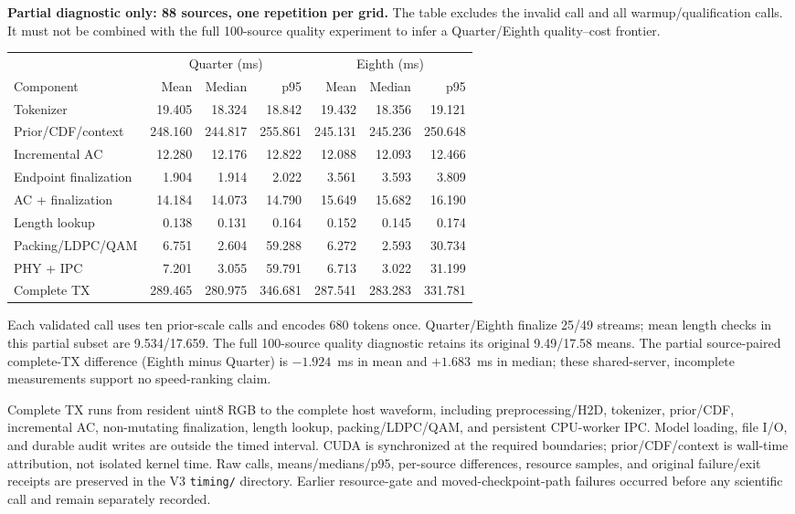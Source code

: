 \textbf{Partial diagnostic only: 88 sources, one repetition per grid.} The table excludes the invalid call and all warmup/qualification calls. It must not be combined with the full 100-source quality experiment to infer a Quarter/Eighth quality--cost frontier.
\begin{center}\small\setlength{\tabcolsep}{4pt}\begin{tabular}{lrrrrrr}\toprule
 & \multicolumn{3}{c}{Quarter (ms)} & \multicolumn{3}{c}{Eighth (ms)}\\
Component & Mean & Median & p95 & Mean & Median & p95\\\midrule
Tokenizer & 19.405 & 18.324 & 18.842 & 19.432 & 18.356 & 19.121\\
Prior/CDF/context & 248.160 & 244.817 & 255.861 & 245.131 & 245.236 & 250.648\\
Incremental AC & 12.280 & 12.176 & 12.822 & 12.088 & 12.093 & 12.466\\
Endpoint finalization & 1.904 & 1.914 & 2.022 & 3.561 & 3.593 & 3.809\\
AC + finalization & 14.184 & 14.073 & 14.790 & 15.649 & 15.682 & 16.190\\
Length lookup & 0.138 & 0.131 & 0.164 & 0.152 & 0.145 & 0.174\\
Packing/LDPC/QAM & 6.751 & 2.604 & 59.288 & 6.272 & 2.593 & 30.734\\
PHY + IPC & 7.201 & 3.055 & 59.791 & 6.713 & 3.022 & 31.199\\
Complete TX & 289.465 & 280.975 & 346.681 & 287.541 & 283.283 & 331.781\\
\bottomrule\end{tabular}\end{center}
Each validated call uses ten prior-scale calls and encodes 680 tokens once. Quarter/Eighth finalize 25/49 streams; mean length checks in this partial subset are 9.534/17.659. The full 100-source quality diagnostic retains its original 9.49/17.58 means. The partial source-paired complete-TX difference (Eighth minus Quarter) is $-1.924$~ms in mean and $+1.683$~ms in median; these shared-server, incomplete measurements support no speed-ranking claim.

Complete TX runs from resident uint8 RGB to the complete host waveform, including preprocessing/H2D, tokenizer, prior/CDF, incremental AC, non-mutating finalization, length lookup, packing/LDPC/QAM, and persistent CPU-worker IPC. Model loading, file I/O, and durable audit writes are outside the timed interval. CUDA is synchronized at the required boundaries; prior/CDF/context is wall-time attribution, not isolated kernel time. Raw calls, means/medians/p95, per-source differences, resource samples, and original failure/exit receipts are preserved in the V3 \texttt{timing/} directory. Earlier resource-gate and moved-checkpoint-path failures occurred before any scientific call and remain separately recorded.
